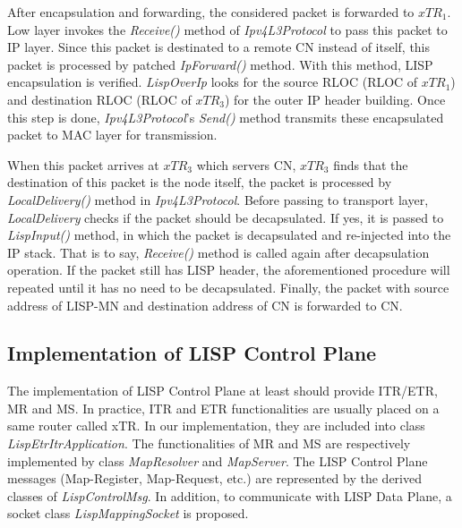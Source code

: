 After encapsulation and forwarding, the considered packet is forwarded to $xTR_1$. %
Low layer invokes the \emph{Receive()} method of \emph{Ipv4L3Protocol} to pass this packet to IP layer. Since this packet is destinated to a remote CN instead of itself, this packet is processed by patched \emph{IpForward()} method. %
With this method, LISP encapsulation is verified. \emph{LispOverIp} looks for the source RLOC (RLOC of $xTR_1$) and destination RLOC (RLOC of $xTR_3$) for the outer IP header building. Once this step is done, \emph{Ipv4L3Protocol}'s \emph{Send()} method transmits these encapsulated packet to MAC layer for transmission.

When this packet arrives at $xTR_3$ which servers CN, $xTR_3$ finds that the destination of this packet is the node itself, the packet is processed by \emph{LocalDelivery()} method in \emph{Ipv4L3Protocol}. Before passing to transport layer, \emph{LocalDelivery} checks if the packet should be decapsulated. If yes, it is passed to \emph{LispInput()} method, in which the packet is decapsulated and re-injected into the IP stack. That is to say, \emph{Receive()} method is called again after decapsulation operation. If the packet still has LISP header, the aforementioned procedure will repeated until it has no need to be decapsulated. Finally, the packet with source address of LISP-MN and destination address of CN is forwarded to CN.

\subsection{Implementation of LISP Control Plane}
\label{subsec:control-plane-impl}
The implementation of LISP Control Plane at least should provide ITR/ETR, MR and MS. In practice, ITR and ETR functionalities are usually placed on a same router called xTR. In our implementation, they are included into class \emph{LispEtrItrApplication}. The functionalities of MR and MS are respectively implemented by class \emph{MapResolver} and \emph{MapServer}. The LISP Control Plane messages (Map-Register, Map-Request, etc.) are represented by the derived classes of \emph{LispControlMsg}. In addition, to communicate with LISP Data Plane, a socket class \emph{LispMappingSocket} is proposed.

